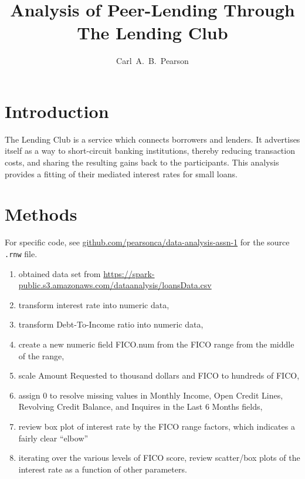 \documentclass{article}
\begin{document}


\title{Analysis of Peer-Lending Through The Lending Club}
\author{Carl~A.~B.~Pearson}
\maketitle
\section*{Introduction}
The Lending Club\cite{lending} is a service which connects borrowers and lenders.  It advertises itself as a way to short-circuit banking institutions, thereby reducing transaction costs, and sharing the resulting gains back to the participants.  This analysis provides a fitting of their mediated interest rates for small loans.

\section{Methods}
For specific code, see \href{github.com/pearsonca/data-analysis-assn-1}{github.com/pearsonca/data-analysis-assn-1} for the source \texttt{.rnw} file.
\begin{enumerate}
\item obtained data set from \href{https://spark-public.s3.amazonaws.com/dataanalysis/loansData.csv}{https://spark-public.s3.amazonaws.com/dataanalysis/loansData.csv}
\item transform interest rate into numeric data,
\item transform Debt-To-Income ratio into numeric data,
\item create a new numeric field FICO.num from the FICO\cite{wikiFICO} range from the middle of the range,
\item scale Amount Requested to thousand dollars and FICO to hundreds of FICO,
\item assign 0 to resolve missing values in Monthly Income, Open Credit Lines, Revolving Credit Balance, and Inquires in the Last 6 Months fields,
\item review box plot of interest rate by the FICO range factors, which indicates a fairly clear ``elbow''
\item iterating over the various levels of FICO score, review scatter/box plots of the interest rate as a function of other parameters.
\end{enumerate}
\end{document}
